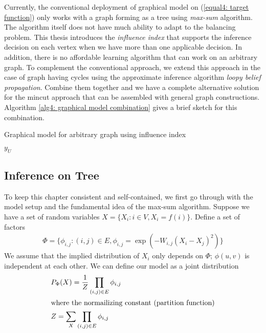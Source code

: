 Currently, the conventional deployment of graphical model on (\ref{equal4: target function}) only works with a graph forming as a tree using \textit{max-sum} algorithm. The algorithm itself does not have much ability to adapt to the balancing problem. This thesis introduces the \textit{influence index} that supports the inference decision on each vertex when we have more than one applicable decision. In addition, there is no affordable learning algorithm that can work on an arbitrary graph. To complement the conventional approach, we extend this approach in the case of graph having cycles using the approximate inference algorithm \textit{loopy belief propagation}. Combine them together and we have a complete alternative solution for the mincut approach that can be assembled with general graph constructions. Algorithm \ref{alg4: graphical model combination} gives a brief sketch for this combination.
\begin{algorithm}[H]
	\caption{Graphical model for arbitrary graph using influence index}
	\begin{algorithmic}[1]
		\Else
		\EndIf
		\RETURN $y_U$
		
		\EndFunction
	\end{algorithmic}
	\label{alg4: graphical model combination}
\end{algorithm}

\subsection{Inference on Tree}
To keep this chapter consistent and self-contained, we first go through with the model setup and the fundamental idea of the max-sum algorithm. Suppose we have a set of random variables $X = \{X_i : i \in V, X_i = f(i) \}$. Define a set of factors
\begin{align}
	\Phi = \{ \phi_{i,j} : (i,j) \in E, \phi_{i,j} = \exp(-W_{i,j}(X_i - X_j)^2) \}
\end{align}
We assume that the implied distribution of $X_i$ only depends on $\Phi$; $\phi(u,v)$ is independent at each other. We can define our model as a joint distribution
\begin{align}
	\label{equal4: graphical model}
	& P_\Phi(X) = \frac{1}{Z} \prod_{(i,j) \in E}{\phi_{i,j}} \\
	\intertext{where the normailizing constant (partition function)}
	&Z = \sum_{X} \prod_{(i,j) \in E}{\phi_{i,j}}\nonumber
\end{align}

